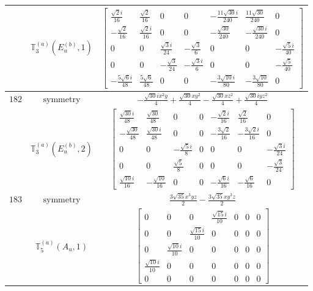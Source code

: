 \documentclass[fleqn,8pt,landscape]{jsarticle}
\begin{document}
\begin{longtable}{ccc}
$  $ & $ \mathbb{T}_{3}^{(a)}(E_{u}^{(b)},1) $ & $ \begin{bmatrix} \frac{\sqrt{2} i}{16} & \frac{\sqrt{2}}{16} & 0 & 0 & - \frac{11 \sqrt{30} i}{240} & \frac{11 \sqrt{30}}{240} & 0 \\ - \frac{\sqrt{2}}{16} & \frac{\sqrt{2} i}{16} & 0 & 0 & - \frac{\sqrt{30}}{240} & - \frac{\sqrt{30} i}{240} & 0 \\ 0 & 0 & \frac{\sqrt{3} i}{24} & - \frac{\sqrt{3}}{6} & 0 & 0 & - \frac{\sqrt{5} i}{40} \\ 0 & 0 & - \frac{\sqrt{3}}{24} & - \frac{\sqrt{3} i}{6} & 0 & 0 & - \frac{\sqrt{5}}{40} \\ - \frac{5 \sqrt{6} i}{48} & \frac{5 \sqrt{6}}{48} & 0 & 0 & - \frac{3 \sqrt{10} i}{80} & - \frac{3 \sqrt{10}}{80} & 0 \end{bmatrix} $ \\ \hline
$ 182 $ & $ \text{symmetry} $ & $ - \frac{\sqrt{30} i x^{2} y}{4} + \frac{\sqrt{30} x y^{2}}{4} - \frac{\sqrt{30} x z^{2}}{4} + \frac{\sqrt{30} i y z^{2}}{4} $ \\
$  $ & $ \mathbb{T}_{3}^{(a)}(E_{u}^{(b)},2) $ & $ \begin{bmatrix} \frac{\sqrt{30} i}{48} & \frac{\sqrt{30}}{48} & 0 & 0 & - \frac{\sqrt{2} i}{16} & \frac{\sqrt{2}}{16} & 0 \\ - \frac{\sqrt{30}}{48} & \frac{\sqrt{30} i}{48} & 0 & 0 & - \frac{3 \sqrt{2}}{16} & - \frac{3 \sqrt{2} i}{16} & 0 \\ 0 & 0 & - \frac{\sqrt{5} i}{8} & 0 & 0 & 0 & - \frac{\sqrt{3} i}{24} \\ 0 & 0 & \frac{\sqrt{5}}{8} & 0 & 0 & 0 & - \frac{\sqrt{3}}{24} \\ \frac{\sqrt{10} i}{16} & - \frac{\sqrt{10}}{16} & 0 & 0 & - \frac{\sqrt{6} i}{16} & - \frac{\sqrt{6}}{16} & 0 \end{bmatrix} $ \\ \hline
$ 183 $ & $ \text{symmetry} $ & $ \frac{3 \sqrt{35} x^{3} y z}{2} - \frac{3 \sqrt{35} x y^{3} z}{2} $ \\
$  $ & $ \mathbb{T}_{5}^{(a)}(A_{u},1) $ & $ \begin{bmatrix} 0 & 0 & 0 & \frac{\sqrt{15} i}{10} & 0 & 0 & 0 \\ 0 & 0 & \frac{\sqrt{15} i}{10} & 0 & 0 & 0 & 0 \\ 0 & \frac{\sqrt{10} i}{10} & 0 & 0 & 0 & 0 & 0 \\ \frac{\sqrt{10} i}{10} & 0 & 0 & 0 & 0 & 0 & 0 \\ 0 & 0 & 0 & 0 & 0 & 0 & 0 \end{bmatrix} $ \\ \hline

\end{longtable}
\end{document}
